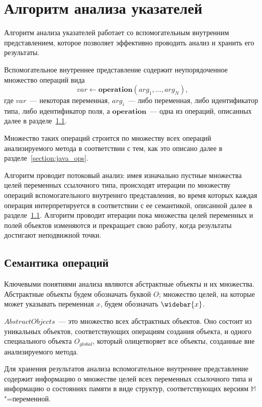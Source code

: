 \documentclass[14pt,titlepage,draft]{extarticle}
\newcommand{\M}{\ensuremath{\mathbb{M}}}
\newcommand{\op}[1]{\mathbf{#1}}
\newcommand{\pts}[1]{\widebar{#1}}
\begin{document}
  \section{Алгоритм анализа указателей}

    Алгоритм анализа указателей работает со вспомогательным внутренним
    представлением, которое позволяет эффективно проводить анализ и хранить его
    результаты.

    Вспомогательное внутреннее представление содержит неупорядоченное множество
    операций вида
    \[ var \gets \op{operation}(arg_1, \ldots, arg_N), \]
    где $var$~--- некоторая переменная, $arg_i$~--- либо переменная, либо
    идентификатор типа, либо идентификатор поля, а $\op{operation}$~--- одна из
    операций, описанных далее в разделе~\ref{section:ops_semantic}.

    Множество таких операций строится по множеству всех операций
    анализируемого метода в соответствии с тем, как это описано далее в
    разделе~\ref{section:java_ops}.

    Алгоритм проводит потоковый анализ: имея изначально пустные
    множества целей переменных ссылочного типа, происходят итерации по
    множеству операций вспомогательного внутреннго представления, во время
    которых каждая операция интерпретируется в соответствии с ее семантикой,
    описанной далее в разделе~\ref{section:ops_semantic}. Алгоритм проводит
    итерации пока множества целей переменных и полей объектов изменяются и
    прекращает свою работу, когда результаты достигают неподвижной точки.


    \subsection{Семантика операций}
      \label{section:ops_semantic}

      Ключевыми понятиями анализа являются абстрактные объекты и их множества.
      Абстрактные объекты будем обозначать буквой $O$; множество целей, на
      которые может указывать переменная $x$, будем обозначать $\pts{x}$.

      $AbstractObjects$~--- это множество всех абстрактных объектов. Оно
      состоит из уникальных объектов, соответствующих операциям создания
      объекта, и одного специального объекта $O_{global}$, который олицетворяет
      все объекты, созданные вне анализируемого метода.

      Для хранения результатов анализа вспомогательное внутреннее представление
      содержит информацию о множестве целей всех переменных ссылочного
      типа и информацию о состояниях памяти в виде структур, соответствующих
      версиям \M"=переменной.
\end{document}
